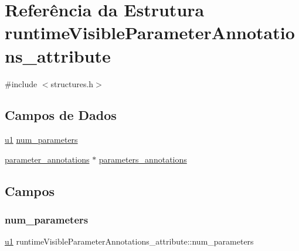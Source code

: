 \hypertarget{structruntimeVisibleParameterAnnotations__attribute}{}\section{Referência da Estrutura runtime\+Visible\+Parameter\+Annotations\+\_\+attribute}
\label{structruntimeVisibleParameterAnnotations__attribute}


{\ttfamily \#include $<$structures.\+h$>$}

\subsection*{Campos de Dados}
\begin{DoxyCompactItemize}
\item 
\hyperlink{lista__operandos_8h_ad9f4cdb6757615aae2fad89dab3c5470}{u1} \hyperlink{structruntimeVisibleParameterAnnotations__attribute_ae31e0bdeb2761d98c425ff91c84a5eea}{num\+\_\+parameters}
\item 
\hyperlink{structparameter__annotations}{parameter\+\_\+annotations} $\ast$ \hyperlink{structruntimeVisibleParameterAnnotations__attribute_a42e5e477f793842b0caeba7b32088740}{parameters\+\_\+annotations}
\end{DoxyCompactItemize}


\subsection{Campos}
\mbox{\label{structruntimeVisibleParameterAnnotations__attribute_ae31e0bdeb2761d98c425ff91c84a5eea}} 
\subsubsection{\texorpdfstring{num\+\_\+parameters}{num\_parameters}}
{\footnotesize\ttfamily \hyperlink{lista__operandos_8h_ad9f4cdb6757615aae2fad89dab3c5470}{u1} runtime\+Visible\+Parameter\+Annotations\+\_\+attribute\+::num\+\_\+parameters}

